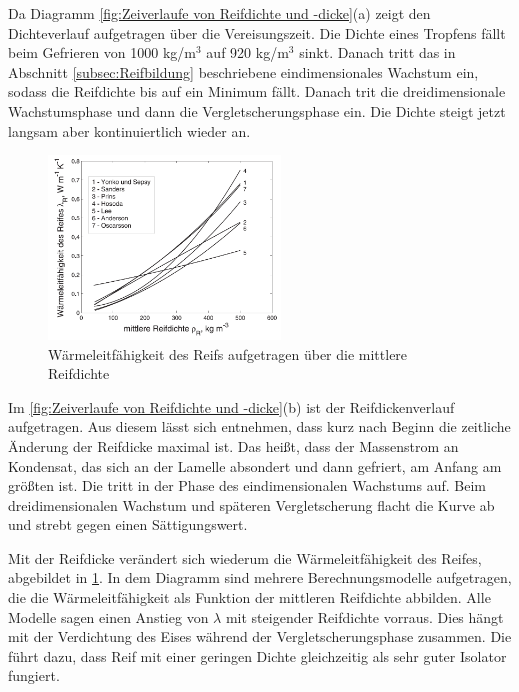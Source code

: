 Da Diagramm \ref{fig:Zeiverlaufe von Reifdichte und -dicke}(a) zeigt den Dichteverlauf aufgetragen über die Vereisungszeit. Die Dichte eines Tropfens fällt beim Gefrieren von 1000 kg/m$^3$ auf 920 kg/m$^3$ sinkt. Danach tritt das in Abschnitt \ref{subsec:Reifbildung} beschriebene eindimensionales Wachstum ein, sodass die Reifdichte bis auf ein Minimum fällt. Danach trit die dreidimensionale Wachstumsphase und dann die Vergletscherungsphase ein. Die Dichte  steigt jetzt langsam aber kontinuiertlich wieder an.

\begin{figure}[htb]
\centering	
\includegraphics[width=0.55\textwidth]{Pictures/Waermeleitfaehigkeit_Schydlo.png}
\caption{Wärmeleitfähigkeit des Reifs aufgetragen über die mittlere Reifdichte \citep{Schydlo2010}}
\label{fig:Waermeleitfaehigkeit}
\end{figure}

Im \ref{fig:Zeiverlaufe von Reifdichte und -dicke}(b) ist der Reifdickenverlauf aufgetragen. Aus diesem lässt sich entnehmen, dass kurz nach Beginn die zeitliche Änderung der Reifdicke maximal ist. Das heißt, dass der Massenstrom an Kondensat, das sich an der Lamelle absondert und dann gefriert, am Anfang am größten ist. Die tritt in der Phase des eindimensionalen Wachstums auf. Beim dreidimensionalen Wachstum und späteren Vergletscherung flacht die Kurve ab und strebt gegen einen Sättigungswert. 


 
Mit der Reifdicke verändert sich wiederum die Wärmeleitfähigkeit des Reifes, abgebildet in \ref{fig:Waermeleitfaehigkeit}. In dem Diagramm sind mehrere Berechnungsmodelle aufgetragen, die die Wärmeleitfähigkeit als Funktion der mittleren Reifdichte abbilden. Alle Modelle sagen einen Anstieg von $\lambda$ mit steigender Reifdichte vorraus. Dies hängt mit der Verdichtung des Eises während der Vergletscherungsphase zusammen. Die führt dazu, dass Reif mit einer geringen Dichte gleichzeitig als sehr guter Isolator fungiert. \citep{Baehr2014}  \citep{Kosowski2009}


